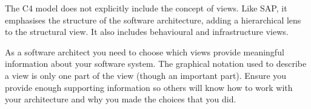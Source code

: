 The C4 model does not explicitly include the concept of views.
Like SAP, it emphasises the structure of the software architecture, adding a hierarchical lens to the structural view.
It also includes behavioural and infrastructure views.

As a software architect you need to choose which views provide meaningful information about your software system.
The graphical notation used to describe a view is only one part of the view (though an important part).
Ensure you provide enough supporting information so others will know how to work with your architecture and why you made the choices that you did.